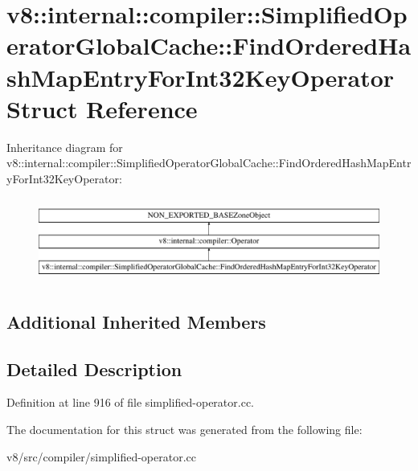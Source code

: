 \hypertarget{structv8_1_1internal_1_1compiler_1_1SimplifiedOperatorGlobalCache_1_1FindOrderedHashMapEntryForInt32KeyOperator}{}\section{v8\+:\+:internal\+:\+:compiler\+:\+:Simplified\+Operator\+Global\+Cache\+:\+:Find\+Ordered\+Hash\+Map\+Entry\+For\+Int32\+Key\+Operator Struct Reference}
\label{structv8_1_1internal_1_1compiler_1_1SimplifiedOperatorGlobalCache_1_1FindOrderedHashMapEntryForInt32KeyOperator}
Inheritance diagram for v8\+:\+:internal\+:\+:compiler\+:\+:Simplified\+Operator\+Global\+Cache\+:\+:Find\+Ordered\+Hash\+Map\+Entry\+For\+Int32\+Key\+Operator\+:\begin{figure}[H]
\begin{center}
\leavevmode
\includegraphics[height=2.786070cm]{structv8_1_1internal_1_1compiler_1_1SimplifiedOperatorGlobalCache_1_1FindOrderedHashMapEntryForInt32KeyOperator}
\end{center}
\end{figure}
\subsection*{Additional Inherited Members}


\subsection{Detailed Description}


Definition at line 916 of file simplified-\/operator.\+cc.



The documentation for this struct was generated from the following file\+:\begin{DoxyCompactItemize}
\item 
v8/src/compiler/simplified-\/operator.\+cc\end{DoxyCompactItemize}
